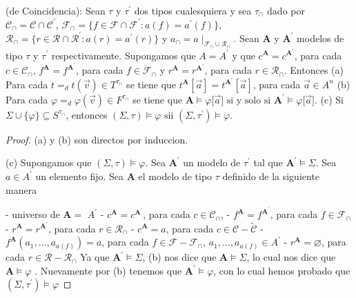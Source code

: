   \begin{lemma}
    (de Coincidencia): Sean \(\tau \) y \(\tau ^{\prime }\) dos tipos cualesquiera y sea \(\tau _{\cap }\) dado por \(\mathcal{C}_{\cap }=\mathcal{C}\cap \mathcal{C} ^{\prime }\), \(\mathcal{F}_{\cap }=\{f\in \mathcal{F}\cap \mathcal{F}^{\prime }:a(f)=a^{\prime }(f)\}\), \(\mathcal{R}_{\cap }=\{r\in \mathcal{R}\cap \mathcal{R}^{\prime }:a(r)=a^{\prime }(r)\}\) y \(a_{\cap }=a\mid _{\mathcal{F} _{\cap }\cup \mathcal{R}_{\cap }}\). Sean \(\mathbf{A}\) y \(\mathbf{A}^{\prime } \) modelos de tipo \(\tau \) y \(\tau ^{\prime }\) respectivamente. Supongamos que \(A=A^{\prime }\) y que \(c^{\mathbf{A}}=c^{\mathbf{A}^{\prime }}\), para cada \(c\in \mathcal{C}_{\cap }\), \(f^{\mathbf{A}}=f^{\mathbf{A}^{\prime }}\), para cada \(f\in \mathcal{F}_{\cap }\) y \(r^{\mathbf{A}}=r^{\mathbf{A}^{\prime }}\), para cada \(r\in \mathcal{R}_{\cap }\). Entonces
    (a) Para cada \(t=_{d}t(\vec{v})\in T^{\tau _{\cap }}\) se tiene que \( t^{\mathbf{A}}[\vec{a}]=t^{\mathbf{A}^{\prime }}[\vec{a}]\), para cada \(\vec{a }\in A^{n}\)
    (b) Para cada \(\varphi =_{d}\varphi (\vec{v})\in F^{\tau _{\cap }}\) se tiene que
    \(\displaystyle \mathbf{A}\models \varphi \lbrack \vec{a}]\text{ si y solo si }\mathbf{A} ^{\prime }\models \varphi \lbrack \vec{a}]\text{.} \)
    (c) Si \(\Sigma \cup \{\varphi \}\subseteq S^{\tau _{\cap }}\), entonces
    \(\displaystyle (\Sigma ,\tau )\models \varphi \text{ sii }(\Sigma ,\tau ^{\prime })\models \varphi \text{.} \)
  \end{lemma}
  \begin{proof}
    (a) y (b) son directos por induccion.

    (c) Supongamos que \((\Sigma ,\tau )\models \varphi \). Sea \(\mathbf{A} ^{\prime }\) un modelo de \(\tau ^{\prime }\) tal que \(\mathbf{A}^{\prime }\models \Sigma \). Sea \(a\in A^{\prime }\) un elemento fijo. Sea \(\mathbf{A}\) el modelo de tipo \(\tau \) definido de la siguiente manera

    - universo de \(\mathbf{A}=\) \(A^{\prime }\)
    - \(c^{\mathbf{A}}=c^{\mathbf{A}^{\prime }}\), para cada \(c\in \mathcal{ C}_{\cap }\),
    - \(f^{\mathbf{A}}=f^{\mathbf{A}^{\prime }}\), para cada \(f\in \mathcal{ F}_{\cap }\)
    - \(r^{\mathbf{A}}=r^{\mathbf{A}^{\prime }}\), para cada \(r\in \mathcal{ R}_{\cap }\)
    - \(c^{\mathbf{A}}=a\), para cada \(c\in \mathcal{C}-\widetilde{\mathcal{ C}}\)
    - \(f^{\mathbf{A}}(a_{1},...,a_{a(f)})=a\), para cada \(f\in \mathcal{F}- \mathcal{F}_{\cap }\), \(a_{1},...,a_{a(f)}\in A^{\prime }\)
    - \(r^{\mathbf{A}}=\varnothing \), para cada \(r\in \mathcal{R-R}_{\cap }\)
    Ya que \(\mathbf{A}^{\prime }\models \Sigma \), (b) nos dice que \( \mathbf{A}\models \Sigma \), lo cual nos dice que \(\mathbf{A}\models \varphi \) . Nuevamente por (b) tenemos que \(\mathbf{A}^{\prime }\models \varphi \), con lo cual hemos probado que \((\Sigma ,\tau ^{\prime })\models \varphi \)
  \end{proof}

